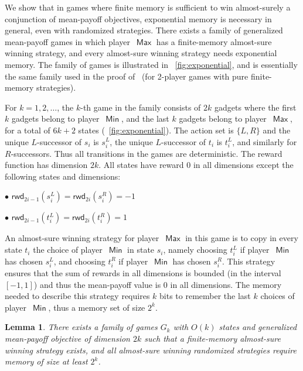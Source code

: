 \documentclass{article}
\newtheorem{lemma}{Lemma}
\DeclareMathOperator{\ma}{\mathsf{Max}}
\DeclareMathOperator{\mi}{\mathsf{Min}}
\newcommand{\rwd}{\mathsf{rwd}}
\begin{document}
\smallskip{}
We show that in games where finite memory is sufficient to win almost-surely 
a conjunction of mean-payoff objectives, exponential memory is necessary in general,
even with randomized strategies. There exists a 
family of generalized mean-payoff games in which player~$\ma$ has a finite-memory almost-sure winning 
strategy, and every almost-sure winning strategy needs exponential memory.
The family of games is illustrated in \figurename~\ref{fig:exponential},
and is essentially the same family used in the proof of~\cite[Lemma 8]{CRR14}
(for 2-player games with pure finite-memory strategies). 

\smallskip{}
For $k=1,2,\dots$, the $k$-th game in the family consists of $2k$ gadgets where
the first $k$ gadgets belong to player~$\mi$, and the last $k$ gadgets belong to 
player~$\ma$, for a total of $6k + 2$ states (\figurename~\ref{fig:exponential}). 
The action set is $\{L,R\}$ and the unique $L$-successor of $s_i$ is $s_i^L$,
the unique $L$-successor of $t_i$ is $t_i^L$, and similarly for $R$-successors.
Thus all transitions in the games are deterministic.
The reward function has dimension $2k$. All states have reward $0$ in all dimensions 
except the following states and dimensions:
\begin{compactitem}
\item[$\bullet$] $\rwd_{2i-1}(s_i^L) = \rwd_{2i}(s_i^R) = -1$
\item[$\bullet$] $\rwd_{2i-1}(t_i^L) = \rwd_{2i}(t_i^R) = 1$
\end{compactitem}
An almost-sure winning strategy for player~$\ma$ in this game is to copy in 
every state $t_i$ the choice of player~$\mi$ in state $s_i$, namely choosing 
$t_i^L$ if player~$\mi$ has chosen $s_i^L$, and choosing $t_i^R$ if player~$\mi$ 
has chosen $s_i^R$. This strategy ensures that the sum of rewards in all 
dimensions is bounded (in the interval $[-1,1]$) and thus the mean-payoff value
is $0$ in all dimensions. The memory needed to describe this strategy requires
$k$ bits to remember the last $k$ choices of player~$\mi$, thus a memory set of 
size $2^{k}$.

\begin{lemma}\label{lem:exponential}
There exists a family of games $G_k$ with $O(k)$ states and generalized mean-payoff
objective of dimension $2k$ such that a finite-memory almost-sure winning strategy exists,
and all almost-sure winning randomized strategies require memory of size at least $2^k$.
\end{lemma}
\end{document}
